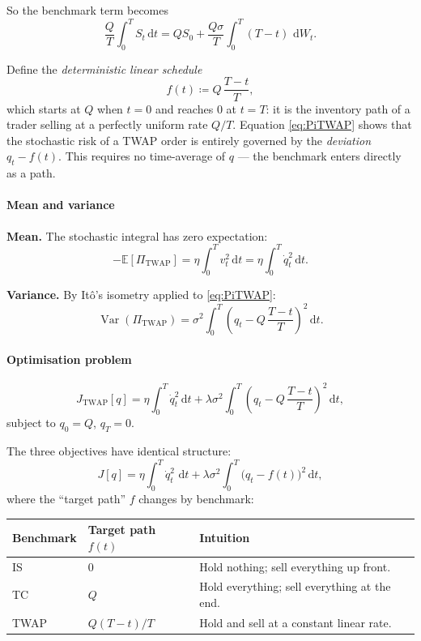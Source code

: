 \documentclass[12pt, a4paper]{article}
\newcommand{\E}{\mathbb{E}}
\newcommand{\Var}{\operatorname{Var}}
\newcommand{\dd}{\,\mathrm{d}}
\begin{document}
So the benchmark term becomes
\[
  \frac{Q}{T}\int_0^T S_t \dd t
  = QS_0 + \frac{Q\sigma}{T}\int_0^T (T-t)\,\dd W_t.
\]

\begin{keybox}
  Define the \emph{deterministic linear schedule}
  \[
    f(t) \coloneqq Q\,\frac{T-t}{T},
  \]
  which starts at $Q$ when $t=0$ and reaches $0$ at $t=T$:
  it is the inventory path of a trader selling at a perfectly uniform rate $Q/T$.
  Equation \eqref{eq:PiTWAP} shows that the stochastic risk of a TWAP order
  is entirely governed by the \emph{deviation} $q_t - f(t)$.
  This requires no time-average of $q$ — the benchmark enters directly as a path.
\end{keybox}


\paragraph{Mean and variance}

\textbf{Mean.} The stochastic integral has zero expectation:
\[
  -\E[\Pi_{\mathrm{TWAP}}] = \eta\!\int_0^T v_t^2 \dd t = \eta\!\int_0^T \dot q_t^2 \dd t.
\]

\textbf{Variance.} By It\^{o}'s isometry applied to \eqref{eq:PiTWAP}:
\[
  \Var(\Pi_{\mathrm{TWAP}})
  = \sigma^2\!\int_0^T \!\left(q_t - Q\,\frac{T-t}{T}\right)^{\!2} \dd t.
\]

\paragraph{Optimisation problem}

\begin{equation}
  J_{\mathrm{TWAP}}[q]
  = \eta\!\int_0^T \dot q_t^2 \dd t
    + \lambda\sigma^2\!\int_0^T \!\left(q_t - Q\,\frac{T-t}{T}\right)^{\!2} \dd t,
  \label{eq:JTWAP}
\end{equation}
subject to $q_0 = Q$, $q_T = 0$.

\begin{notebox}
The three objectives have identical structure:
\[
  J[q] = \eta\!\int_0^T\dot q_t^2\,\dd t + \lambda\sigma^2\!\int_0^T\bigl(q_t - f(t)\bigr)^2\dd t,
\]
where the ``target path'' $f$ changes by benchmark:
\begin{center}
  \renewcommand{\arraystretch}{1.4}
  \begin{tabular}{@{}lll@{}}
    \toprule
    Benchmark & Target path $f(t)$ & Intuition \\
    \midrule
    IS   & $0$              & Hold nothing; sell everything up front. \\
    TC   & $Q$              & Hold everything; sell everything at the end. \\
    TWAP & $Q(T-t)/T$  & Hold and sell at a constant linear rate. \\
    \bottomrule
  \end{tabular}
\end{center}
\end{notebox}
\end{document}
